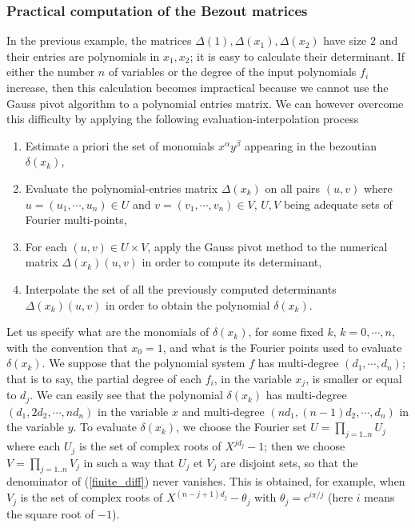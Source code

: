 \documentclass{standalone}
\begin{document}
\subsubsection{Practical computation of the Bezout matrices}
In the previous example, the matrices $\Delta(1), \Delta(x_1), \Delta(x_2)$ have size $2$ and their entries are polynomials in $x_1, x_2$; it is easy to calculate their determinant. If either the number  $n$ of variables or the degree of the input polynomials $f_i$ increase, then this calculation becomes impractical because we cannot use the Gauss pivot algorithm to a polynomial entries matrix. We can however overcome this difficulty by applying the following evaluation-interpolation process
\begin{enumerate}
\item
Estimate a priori the set of monomials $x^\alpha y^\beta$ appearing in the bezoutian $\delta(x_k)$,
\item
Evaluate the polynomial-entries matrix $\Delta(x_k)$ on all pairs $(u, v)$ where $u = (u_1,\cdots, u_n) \in U$ and $v = (v_1,\cdots, v_n) \in V$, $U, V$ being adequate sets of Fourier multi-points,
\item
For each $(u, v) \in U\times V$, apply the Gauss pivot method to the numerical matrix $\Delta(x_k)(u, v)$ in order to compute its determinant,
\item
Interpolate the set of all the previously computed determinants $\Delta(x_k)(u, v)$ in order to obtain the polynomial $\delta(x_k)$.
\end{enumerate}
Let us specify what are the monomials of $\delta(x_k)$, for some fixed $k$, $k = 0,\cdots, n$, with the convention that $x_0 = 1$, and what is the Fourier points used to evaluate $\delta(x_k)$. We suppose that the polynomial system $f$ has multi-degree $(d_1, \cdots, d_n)$; that is to say, the partial degree of each $f_i$, in the variable $x_j$, is smaller or equal to $d_j$. We can easily see that the polynomial $\delta(x_k)$ has multi-degree $(d_1, 2d_2, \cdots, nd_n)$ in the variable $x$ and multi-degree $(nd_1, (n-1)d_2, \cdots, d_n)$ in the variable $y$. To evaluate $\delta(x_k)$, we choose the Fourier set $U = \prod_{j=1..n} U_j$ where each $U_j$ is the set of complex roots of $X^{jd_j} - 1$; then we choose $V = \prod_{j=1..n} V_j$ in such a way that $U_j$ et $V_j$ are disjoint sets, so that the denominator of (\ref{finite_diff}) never vanishes. This is obtained, for example, when $V_j$ is the set of complex roots of $X^{(n-j+1)d_j} - \theta_j$ with $\theta_j = e^{i\pi/j}$ (here $i$ means the square root of $-1$). 
\end{document}
